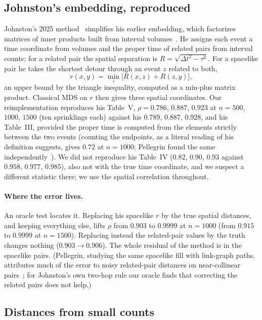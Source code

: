 \documentclass[11pt,a4paper]{article}
\begin{document}
\subsection{Johnston's embedding, reproduced}
Johnston's 2025 method~\cite{Johnston25} simplifies his earlier embedding, which factorizes matrices of inner products built from interval volumes~\cite{Johnston22}. He assigns each event a time coordinate from volumes and the proper time of related pairs from interval counts; for a related pair the spatial separation is $R=\sqrt{\Delta t^2-\tau^2}$. For a spacelike pair he takes the shortest detour through an event $z$ related to both,
\begin{equation}
r(x,y)=\min_z\big[R(x,z)+R(z,y)\big],
\end{equation}
an upper bound by the triangle inequality, computed as a min-plus matrix product. Classical MDS on $r$ then gives three spatial coordinates. Our reimplementation reproduces his Table~V, $\rho=0.786$, $0.887$, $0.923$ at $n=500$, $1000$, $1500$ (ten sprinklings each) against his $0.789$, $0.887$, $0.928$, and his Table~III, provided the proper time is computed from the elements strictly between the two events (counting the endpoints, as a literal reading of his definition suggests, gives $0.72$ at $n=1000$; Pellegrin found the same independently~\cite{Pellegrin26}). We did not reproduce his Table~IV ($0.82$, $0.90$, $0.93$ against $0.958$, $0.977$, $0.985$), also not with the true time coordinate, and we suspect a different statistic there; we use the spatial correlation throughout.

\paragraph{Where the error lives.} An oracle test locates it. Replacing his spacelike $r$ by the true spatial distances, and keeping everything else, lifts $\rho$ from $0.903$ to $0.9999$ at $n=1000$ (from $0.915$ to $0.9999$ at $n=1500$). Replacing instead the related-pair values by the truth changes nothing ($0.903\to0.906$). The whole residual of the method is in the spacelike pairs. (Pellegrin, studying the same spacelike fill with link-graph paths, attributes much of the error to noisy related-pair distances on near-collinear pairs~\cite{Pellegrin26}; for Johnston's own two-hop rule our oracle finds that correcting the related pairs does not help.)

\subsection{Distances from small counts}\label{sec:overlap}
\end{document}
